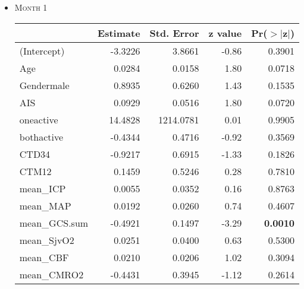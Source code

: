 \documentclass{article}
\begin{document}
\begin{itemize}
\item \textsc{Month 1}
\begin{table}[H]
\centering
\begin{tabular}{lrrrr}
  \hline
 & Estimate & Std. Error & z value & Pr($>$$|$z$|$) \\ 
  \hline
(Intercept) & -3.3226 & 3.8661 & -0.86 & 0.3901 \\ 
  Age & 0.0284 & 0.0158 & 1.80 & 0.0718 \\ 
  Gendermale & 0.8935 & 0.6260 & 1.43 & 0.1535 \\ 
  AIS & 0.0929 & 0.0516 & 1.80 & 0.0720 \\ 
  oneactive & 14.4828 & 1214.0781 & 0.01 & 0.9905 \\ 
  bothactive & -0.4344 & 0.4716 & -0.92 & 0.3569 \\ 
  CTD34 & -0.9217 & 0.6915 & -1.33 & 0.1826 \\ 
  CTM12 & 0.1459 & 0.5246 & 0.28 & 0.7810 \\ 
  mean\_ICP & 0.0055 & 0.0352 & 0.16 & 0.8763 \\ 
  mean\_MAP & 0.0192 & 0.0260 & 0.74 & 0.4607 \\ 
  mean\_GCS.sum & -0.4921 & 0.1497 & -3.29 & {\bf 0.0010} \\ 
  mean\_SjvO2 & 0.0251 & 0.0400 & 0.63 & 0.5300 \\ 
  mean\_CBF & 0.0210 & 0.0206 & 1.02 & 0.3094 \\ 
  mean\_CMRO2 & -0.4431 & 0.3945 & -1.12 & 0.2614 \\ 
   \hline
\end{tabular}
\end{table}



\end{itemize}
\end{document}

